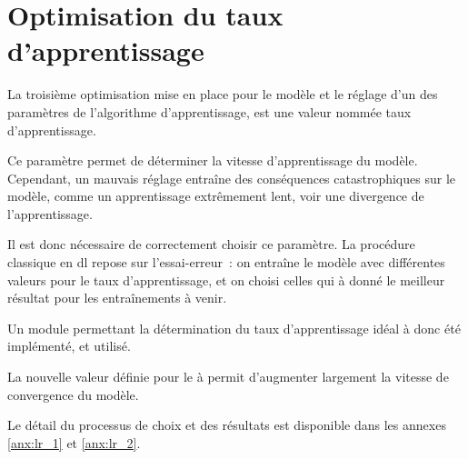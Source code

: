 \section{Optimisation du taux d'apprentissage}\label{lr_opti_papud}
La troisième optimisation mise en place pour le modèle et le réglage d'un des paramètres de l'algorithme d'apprentissage, est une valeur nommée \og taux d'apprentissage\fg{}.

Ce paramètre permet de déterminer la vitesse d'apprentissage du modèle.
Cependant, un mauvais réglage entraîne des conséquences catastrophiques sur le modèle, comme un apprentissage extrêmement lent, voir une divergence de l'apprentissage.

Il est donc nécessaire de correctement choisir ce paramètre.
La procédure classique en \gls{dl} repose sur l'essai-erreur~: on entraîne le modèle avec différentes valeurs pour le taux d'apprentissage, et on choisi celles qui à donné le meilleur résultat pour les entraînements à venir.

Un module permettant la détermination du taux d'apprentissage idéal à donc été implémenté, et utilisé.

La nouvelle valeur définie pour le à permit d'augmenter largement la vitesse de convergence du modèle. %

Le détail du processus de choix et des résultats est disponible dans les annexes \ref{anx:lr_1} et \ref{anx:lr_2}.
